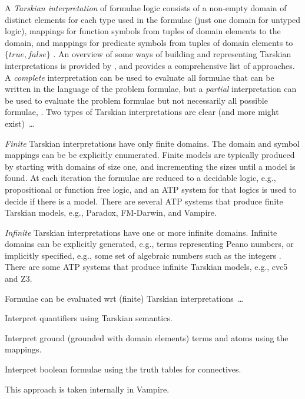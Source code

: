 \documentclass{easychair}
\newenvironment{packed_itemize}{
\vspace*{-0.3em}
\begin{itemize}
\setlength{\partopsep}{0pt}
\setlength{\itemsep}{1pt}
\setlength{\parskip}{0pt}
\setlength{\parsep}{0pt}
}{\end{itemize}}
\begin{document}
A \emph{Tarskian interpretation} \cite{TV56} of formulae logic consists of a non-empty domain of 
distinct elements for each type used in the formulae (just one domain for untyped logic), mappings 
for function symbols from tuples of domain elements to the domain, and mappings for predicate 
symbols from tuples of domain elements to $\{true,false\}$ \cite{Hun96,Gal15}.
An overview of some ways of building and representing Tarskian interpretations is provided 
by \cite{CLP04}, and \cite{Pel03-EQMC} provides a comprehensive list of approaches.
A \emph{complete} interpretation can be used to evaluate all formulae that can be written in the 
language of the problem formulae, but a \emph{partial} interpretation can be used to evaluate the
problem formulae but not necessarily all possible formulae, \cite{BSW23}.
Two types of Tarskian interpretations are clear (and more might exist)~\ldots
\begin{packed_itemize}
\item \emph{Finite} Tarskian interpretations have only finite domains.
      The domain and symbol mappings can be be explicitly enumerated.
      Finite models are typically produced by starting with domains of size one, and incrementing 
      the sizes until a model is found.
      At each iteration the formulae are reduced to a decidable logic, e.g., propositional 
      \cite{CS03,McC03-MACE4-TR} or function free \cite{BF+09} logic, and an ATP system for that
      logics is used to decide if there is a model.
      There are several ATP systems that produce finite Tarskian models, e.g., Paradox, FM-Darwin, 
      and Vampire.
\item \emph{Infinite} Tarskian interpretations have one or more infinite domains.
      Infinite domains can be explicitly generated, e.g., terms representing Peano numbers, or 
      implicitly specified, e.g., some set of algebraic numbers such as the integers \cite{BB13}.
      There are some ATP systems that produce infinite Tarskian models, e.g., cvc5 
      \cite{BB+22-cvc5} and Z3.
\end{packed_itemize}
\vspace*{-0.5em}
Formulae can be evaluated wrt (finite) Tarskian interpretations~\ldots
\begin{packed_itemize}
\item Interpret quantifiers using Tarskian semantics.
\item Interpret ground (grounded with domain elements) terms and atoms using the mappings.
\item Interpret boolean formulae using the truth tables for connectives.
\end{packed_itemize}
\vspace*{-0.5em}
This approach is taken internally in Vampire.
\end{document}
